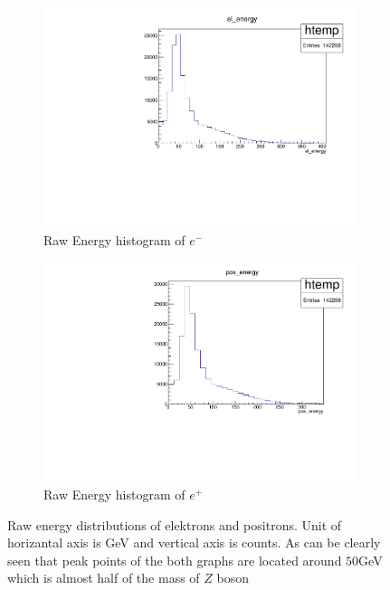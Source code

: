 \begin{figure}[h]
	\begin{subfigure}{0.5\textwidth}
		\includegraphics[width=\textwidth]{../figures/electron_E_histogram_raw.pdf}
		\caption{Raw Energy histogram of $e^-$}
    		\label{fig:e-rawEnergy}
	\end{subfigure}
	\hfill
	\begin{subfigure}{0.5\textwidth}
	 	\includegraphics[width=\textwidth]{../figures/postitron_E_hist_raw.pdf}
		\caption{Raw Energy histogram of $e^+$}
		\label{fig:e+rawEnergy}
	\end{subfigure}
	\caption{Raw energy distributions of elektrons and positrons. Unit of horizantal axis is GeV and vertical axis is counts. As can be clearly seen that peak points of the both graphs are located around $50$GeV which is almost half of the mass of $Z$ boson}
	\label{fig:eRawEnergyHist}
\end{figure}
\FloatBarrier

